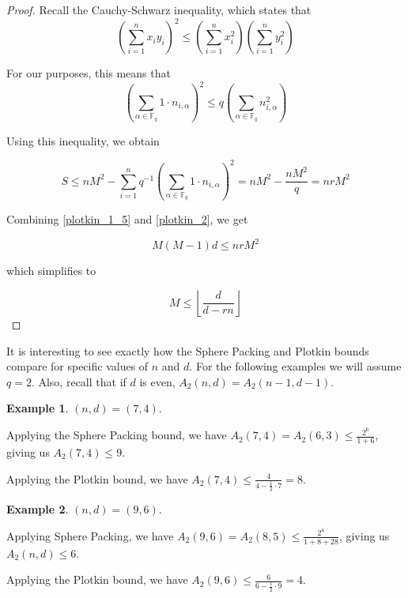\documentclass{article}
\theoremstyle{definition}
\newtheorem{exmp}{Example}
\numberwithin{exmp}{subsection}
\begin{document}
\begin{proof}
Recall the Cauchy-Schwarz inequality, which states that 
\begin{equation}
\left(\sum_{i=1}^n x_i y_i \right )^2 \le \left(\sum_{i=1}^n x_i^2 \right ) \left(\sum_{i=1}^n y_i^2 \right )
\end{equation}

For our purposes, this means that 
\begin{equation}
\left(\sum_{\alpha\in\mathbb{F}_q} 1\cdot n_{i,\alpha} \right )^2 \le q \left(\sum_{\alpha\in\mathbb{F}_q} n_{i,\alpha}^2 \right )
\end{equation}

Using this inequality, we obtain

\begin{equation} \label{plotkin_2}
S \le nM^2 - \sum_{i=1}^n q^{-1} \left(\sum_{\alpha\in\mathbb{F}_q} 1\cdot n_{i,\alpha} \right )^2 = nM^2 - \frac{nM^2}{q} = nrM^2
\end{equation}

Combining \ref{plotkin_1_5} and \ref{plotkin_2}, we get

\begin{equation}
M(M-1)d \le nrM^2
\end{equation}

which simplifies to 

\begin{equation}
M \le \left\lfloor \frac{d}{d-rn} \right\rfloor
\end{equation}

\end{proof}

It is interesting to see exactly how the Sphere Packing and Plotkin bounds compare for specific values of $n$ and $d$.  For the following examples we will assume $q=2$.    
Also, recall that if $d$ is even, $A_2(n,d) = A_2(n-1,d-1)$.  

\begin{exmp}
$(n,d) = (7,4)$.

Applying the Sphere Packing bound, we have $A_2(7,4) = A_2(6,3) \le \frac{2^6}{1 + 6}$, 
giving us $A_2(7,4) \le 9$.

Applying the Plotkin bound, we have $A_2(7,4) \le \frac{4}{4-\frac{1}{2}\cdot7} = 8$.

\end{exmp}

\begin{exmp}
$(n,d) = (9,6)$.

Applying Sphere Packing, we have  $A_2(9,6) = A_2(8,5) \le \frac{2^8}{1+8+28}$, giving us $A_2(n,d) \le 6$.

Applying the Plotkin bound, we have $A_2(9,6) \le \frac{6}{6-\frac{1}{2}\cdot9} = 4$.
\end{exmp}
\end{document}
